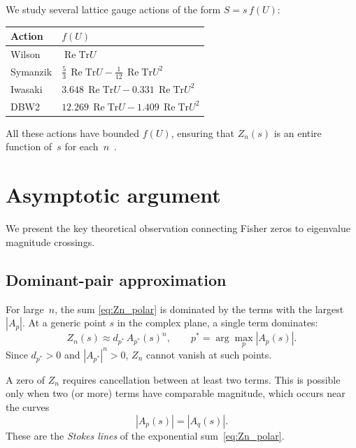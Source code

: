 \documentclass[12pt]{article}
\theoremstyle{definition}
\theoremstyle{remark}
\newcommand{\Tr}{\mathrm{Tr}}
\newcommand{\re}{\operatorname{Re}}
\begin{document}
We study several lattice gauge actions of the form $S = s\,f(U)$:

\begin{center}
\begin{tabular}{ll}
\toprule
Action & $f(U)$ \\
\midrule
Wilson & $\re\Tr U$ \\
Symanzik & $\tfrac{5}{3}\,\re\Tr U - \tfrac{1}{12}\,\re\Tr U^2$ \\
Iwasaki & $3.648\,\re\Tr U - 0.331\,\re\Tr U^2$ \\
DBW2 & $12.269\,\re\Tr U - 1.409\,\re\Tr U^2$ \\
\bottomrule
\end{tabular}
\end{center}

All these actions have bounded $f(U)$, ensuring that $Z_n(s)$ is an
entire function of~$s$ for each~$n$~\cite{OlbrykChi}.


\section{Asymptotic argument}
\label{sec:asymptotic}

We present the key theoretical observation connecting Fisher zeros
to eigenvalue magnitude crossings.

\subsection{Dominant-pair approximation}

For large~$n$, the sum \eqref{eq:Zn_polar} is dominated by the terms
with the largest $|A_p|$.  At a generic point $s$ in the complex
plane, a single term dominates:
\begin{equation}
Z_n(s) \approx d_{p^*}\, A_{p^*}(s)^n, \qquad
p^* = \arg\max_p |A_p(s)|.
\end{equation}
Since $d_{p^*} > 0$ and $|A_{p^*}|^n > 0$, $Z_n$ cannot vanish at
such points.

A zero of $Z_n$ requires cancellation between at least two terms.
This is possible only when two (or more) terms have comparable
magnitude, which occurs near the curves
\begin{equation}\label{eq:Stokes}
|A_p(s)| = |A_q(s)|.
\end{equation}
These are the \emph{Stokes lines} of the exponential
sum~\eqref{eq:Zn_polar}.
\end{document}
